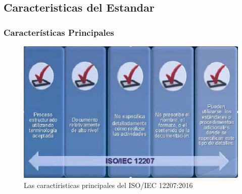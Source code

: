 \documentclass{article}
\begin{document}
\subsection{Caracteristicas del Estandar}\label{sec:Caracteristicas}
\subsubsection{Características Principales}
    \begin{figure}[!h]
        \centering
        \includegraphics[scale=.37]{caracteristicas1.png}
        \caption{Las caractiristicas principales del ISO/IEC 12207:2016}
    \end{figure}
\end{document}

